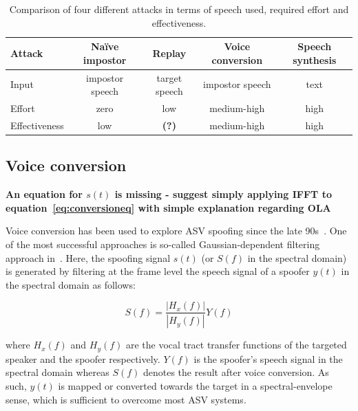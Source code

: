 \begin{table}
\renewcommand{\arraystretch}{1.3}
\begin{center}
    \begin{tabular}{ l | c c c c }
    \hline
     	 Attack & Na\"{i}ve impostor &  Replay & Voice conversion & Speech synthesis\\ 
    \hline
Input         & impostor speech  & target speech & impostor speech & text\\
Effort        & zero & low & medium-high & high\\
Effectiveness & low &  \textbf{(?)} & medium-high & high\\
 \hline
\hline
    \end{tabular}
    \caption{Comparison of four different attacks in terms of speech used,  required effort and effectiveness.}
		\label{tab::attacks}
   \end{center}
\end{table}



\subsection{Voice conversion}
\label{ssec:vconv}

{\bfseries An equation for $s(t)$ is missing - suggest simply applying IFFT to equation~\ref{eq:conversioneq} with simple explanation regarding OLA}

Voice conversion has been used to explore ASV spoofing since the late 90s~\cite{Pellom1999,Perrot2005}.  One of the most successful approaches is so-called Gaussian-dependent filtering approach in~\cite{Matrouf2005}. Here, the spoofing signal $s(t)$ (or $S(f)$ in the spectral domain) is generated by filtering at the frame level the speech signal of a spoofer $y(t)$ in the spectral domain as follows:

\begin{equation}
S(f) = \frac{\left|H_{x}(f)\right|}{\left|H_{y}(f)\right|}Y(f)
\label{eq:conversioneq}
\end{equation}

\noindent where $H_{x}(f)$ and $H_{y}(f)$ are the vocal tract transfer functions of the targeted speaker and the spoofer respectively.  $Y(f)$ is the spoofer's speech signal in the spectral domain whereas $S(f)$ denotes the result after voice conversion.  As such, $y(t)$ is mapped or converted towards the target in a spectral-envelope sense, which is sufficient to overcome most ASV systems. 

